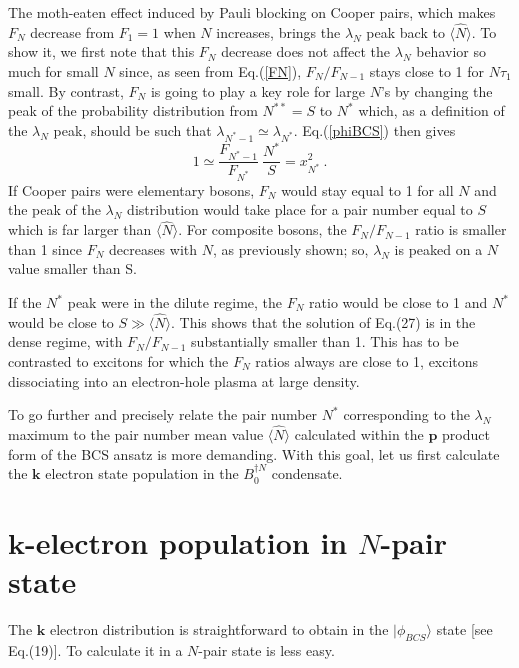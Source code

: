 \documentclass[twocolumn,showpacs]{revtex4}
\def\v#1{\mathbf{#1}}
\begin{document}
The moth-eaten effect induced by Pauli blocking on Cooper pairs, which makes $F_N$ decrease from $F_1=1$ when $N$ increases,  brings the $\lambda_N$ peak back to $\langle\hat{N}\rangle$.  To show it, we first note that this $F_N$ decrease does not affect the $\lambda_N$ behavior so much for small $N$ since, as seen from Eq.(\ref{FN}), $F_N/F_{N-1}$ stays close to 1 for $N\tau_1$ small. By contrast, $F_N$ is going to play a key role for large $N$'s by changing the peak of the probability distribution from $N^{\ast\ast}=S$ to $N^\ast$ which, as a definition of the $\lambda_N$ peak, should be such that 
$\lambda_{N^\ast-1}\simeq \lambda_{N^\ast}$. Eq.(\ref{phiBCS}) then gives
\begin{equation}\label{xn}
1\simeq\frac{F_{N^\ast-1}}{F_{N^\ast}}\ \frac{N^\ast}{S}=x_{N^\ast}^2\ .
\end{equation}
If Cooper pairs were elementary bosons, $F_N$ would stay equal to 1 for all $N$ and the peak of the $\lambda_N$ distribution would take place for a pair number equal to $S$ which is far larger than  $\langle\hat{N}\rangle$. For composite bosons, the $F_N/F_{N-1}$ ratio is smaller than 1 since $F_N$ decreases with $N$, as previously shown; so, $\lambda_N$ is peaked on a $N$ value smaller than S.

If the $N^\ast$ peak were in the dilute regime, the $F_N$ ratio would be close to 1 and $N^\ast$ would be close to $S\gg\langle\hat{N}\rangle$. This shows that the solution of Eq.(27) is in the dense regime, with $F_N/F_{N-1}$ substantially smaller than 1. This has to be contrasted to excitons for which the $F_N$ ratios always are close to 1, excitons dissociating into an electron-hole plasma at large density.

To go further and precisely relate the pair number $N^*$ corresponding to the $\lambda_N$ maximum to the pair number mean value  $\langle\hat{N}\rangle$ calculated within the $\v p$ product form of the BCS ansatz is more demanding. With this goal, let us first calculate the $\v k$ electron state population in the $B_0^{\dag N}$ condensate.

\section{$\v k$-electron population in $N$-pair state}

The $\v k$ electron distribution is straightforward to obtain in the $|\phi_{BCS}\rangle$ state [see Eq.(19)]. To calculate it in a $N$-pair state is less easy.
\end{document}
